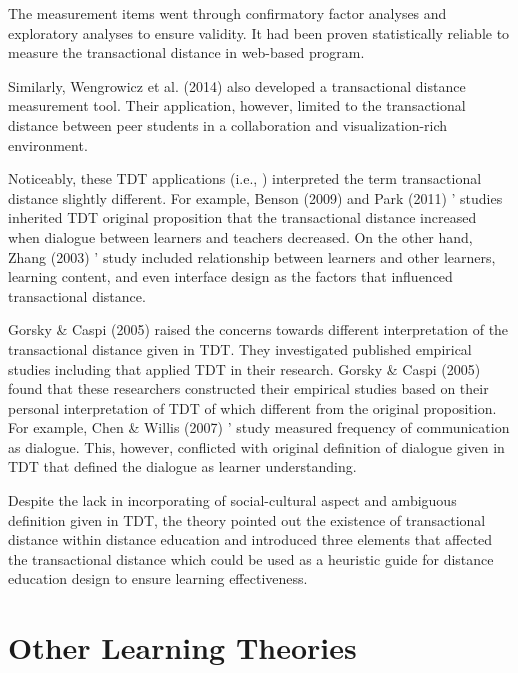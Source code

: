 The measurement items went through confirmatory factor analyses and exploratory analyses to ensure validity. It had been proven statistically reliable to measure the transactional distance in web-based program. 

Similarly, Wengrowicz et al. (2014) \cite{wengrowicz2014transactional} also developed a transactional distance measurement tool. Their application, however, limited to the transactional distance between peer students in a collaboration and visualization-rich environment. 

Noticeably, these TDT applications (i.e., \cite{benson2009addressing, park2011pedagogical, zhang2003transactional, wengrowicz2014transactional}) interpreted the term transactional distance slightly different. For example, Benson (2009) \cite{benson2009addressing} and Park (2011) \cite{park2011pedagogical}' studies inherited TDT original proposition that the transactional distance increased when dialogue between learners and teachers decreased. On the other hand, Zhang (2003) \cite{zhang2003transactional}' study included relationship between learners and other learners, learning content, and even interface design as the factors that influenced transactional distance. 

Gorsky \& Caspi (2005) \cite{gorsky2005critical} raised the concerns towards different interpretation of the transactional distance given in TDT. They investigated published empirical studies including \cite{saba1994verifying, bunker1996study, bischoff1996transactional, chen2001transactional, chen2001dimensions, chen2007path} that applied TDT in their research. Gorsky \& Caspi (2005) \cite{gorsky2005critical} found that these researchers constructed their empirical studies based on their personal interpretation of TDT of which different from the original proposition. For example, Chen \& Willis (2007) \cite{chen2007path}' study measured frequency of communication as dialogue. This, however, conflicted with original definition of dialogue given in TDT that defined the dialogue as learner understanding. 

Despite the lack in incorporating of social-cultural aspect and ambiguous definition given in TDT, the theory pointed out the existence of transactional distance within distance education and introduced three elements that affected the transactional distance which could be used as a heuristic guide for distance education design to ensure learning effectiveness. 

\section{Other Learning Theories} 

